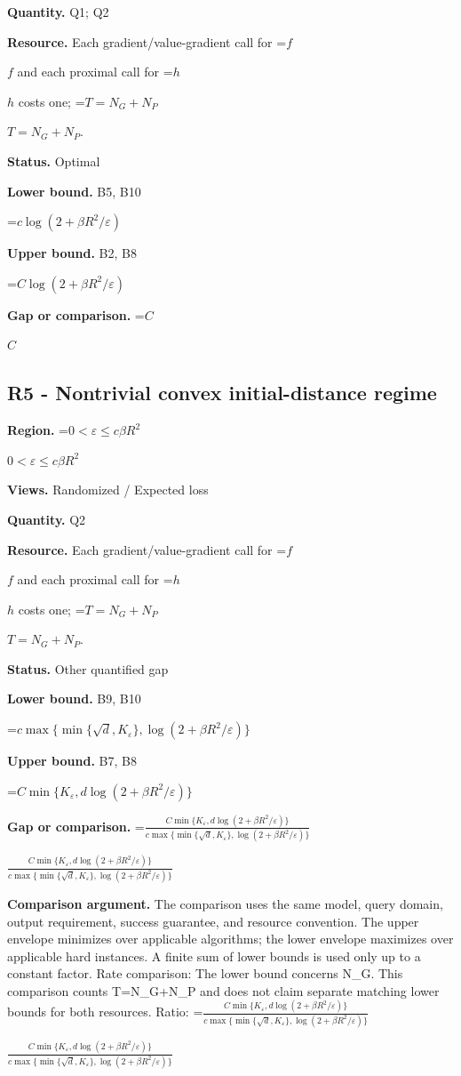 \documentclass[10pt,a4paper]{article}
\newcommand{\AtlasMath}[1]{\par\begingroup\centering\setbox0=\hbox{$\displaystyle #1$}\ifdim\wd0>1.4\linewidth\typeout{ATLAS WIDE FORMULA: \the\wd0}\fi\ifdim\wd0>\linewidth\resizebox{\linewidth}{!}{\box0}\else\box0\fi\par\endgroup}
\newcommand{\AtlasInlineMath}[1]{\begingroup\setbox0=\hbox{$#1$}\ifdim\wd0>.4\linewidth\endgroup\AtlasMath{#1}\else\endgroup$#1$\fi}
\begin{document}
\textbf{Quantity.} Q1; Q2

\textbf{Resource.} Each gradient/value-gradient call for \AtlasInlineMath{f} and each proximal call for \AtlasInlineMath{h} costs one; \AtlasInlineMath{T=N_G+N_P}.

\textbf{Status.} Optimal

\textbf{Lower bound.} B5, B10

\AtlasMath{c\log(2+\beta R^2/\varepsilon)}
\textbf{Upper bound.} B2, B8

\AtlasMath{C\log(2+\beta R^2/\varepsilon)}
\textbf{Gap or comparison.} \AtlasInlineMath{C}

\subsection{R5 - Nontrivial convex initial-distance regime}
\textbf{Region.} \AtlasInlineMath{0<\varepsilon\le c\beta R^2}

\textbf{Views.} Randomized / Expected loss

\textbf{Quantity.} Q2

\textbf{Resource.} Each gradient/value-gradient call for \AtlasInlineMath{f} and each proximal call for \AtlasInlineMath{h} costs one; \AtlasInlineMath{T=N_G+N_P}.

\textbf{Status.} Other quantified gap

\textbf{Lower bound.} B9, B10

\AtlasMath{c\max\{\min\{\sqrt d,K_\varepsilon\},\log(2+\beta R^2/\varepsilon)\}}
\textbf{Upper bound.} B7, B8

\AtlasMath{C\min\{K_\varepsilon,d\log(2+\beta R^2/\varepsilon)\}}
\textbf{Gap or comparison.} \AtlasInlineMath{\frac{C\min\{K_\varepsilon,d\log(2+\beta R^2/\varepsilon)\}}{c\max\{\min\{\sqrt d,K_\varepsilon\},\log(2+\beta R^2/\varepsilon)\}}}

\textbf{Comparison argument.} The comparison uses the same model, query domain, output requirement, success guarantee, and resource convention. The upper envelope minimizes over applicable algorithms; the lower envelope maximizes over applicable hard instances. A finite sum of lower bounds is used only up to a constant factor. Rate comparison: The lower bound concerns N\_G. This comparison counts T=N\_G+N\_P and does not claim separate matching lower bounds for both resources. Ratio: \AtlasInlineMath{\frac{C\min\{K_\varepsilon,d\log(2+\beta R^2/\varepsilon)\}}{c\max\{\min\{\sqrt d,K_\varepsilon\},\log(2+\beta R^2/\varepsilon)\}}}
\end{document}
